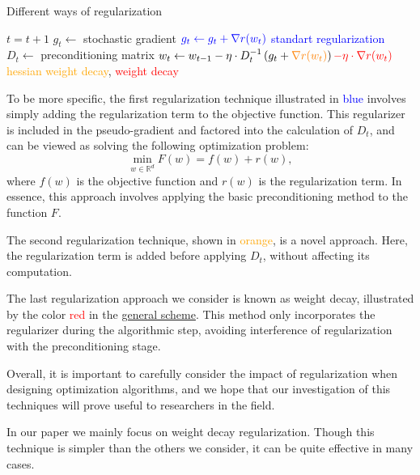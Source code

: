 \documentclass{article}
\begin{document}
\begin{algorithm}[H]
    \caption{Different ways of regularization}
    \label{alg:precond}
    
    \begin{algorithmic}
            
            \State $t = t+1$
            \State $g_t \gets$ stochastic gradient
            \State $\textcolor{blue}{g_t \gets g_t + \nabla r(w_t)}$ \hfill \textcolor{blue}{standart regularization}
            \State $D_t \gets$ preconditioning matrix
            \State $w_t \gets w_{t-1} - \eta \cdot D_t^{-1} \left(g_t +\textcolor{orange}{\nabla r(w_t)} \right) \textcolor{red}{ - \eta \cdot \nabla r(w_t)}$ \hfill \textcolor{orange}{hessian weight decay}, \textcolor{red}{weight decay}
            \EndWhile
    \end{algorithmic}
\end{algorithm}

To be more specific, the first regularization technique illustrated in \textcolor{blue}{blue} involves simply adding the regularization term to the objective function. This regularizer is included in the pseudo-gradient and factored into the calculation of $D_t$, and can be viewed as solving the following optimization problem:
\begin{equation*}
 \min_{w \in \mathbb{R}^d} F(w) = f(w) + r(w),
\end{equation*}
where $f(w)$ is the objective function and $r(w)$ is the regularization term. In essence, this approach involves applying the basic preconditioning method to the function $F$.

The second regularization technique, shown in \textcolor{orange}{orange}, is a novel approach.
Here, the regularization term is added before applying $D_t$, without affecting its computation. 

The last regularization approach we consider is known as weight decay, illustrated by the color \textcolor{red}{red} in the \hyperref[alg:precond]{general scheme}.
This method only incorporates the regularizer during the algorithmic step, avoiding interference of regularization with the preconditioning stage. 

Overall, it is important to carefully consider the impact of regularization when designing optimization algorithms, and we hope that our investigation of this techniques will prove useful to researchers in the field.

In our paper we mainly focus on weight decay regularization.
Though this technique is simpler than the others we consider, it can be quite effective in many cases.
\end{document}

